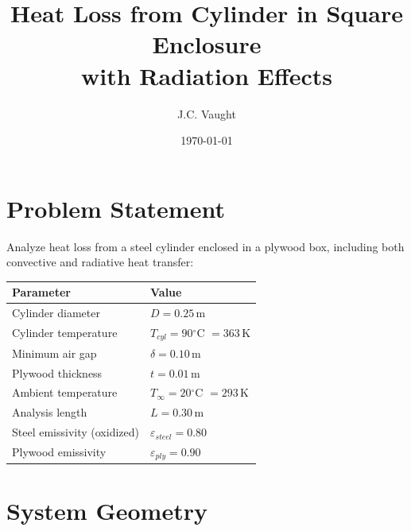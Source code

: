 \documentclass[11pt]{article}
\title{\textbf{Heat Loss from Cylinder in Square Enclosure\\with Radiation Effects}}
\author{J.C. Vaught}
\date{\today}
\newcommand{\degC}{$^\circ$C}
\newcommand{\unit}[1]{\,\mathrm{#1}}
\begin{document}
\maketitle

\section{Problem Statement}

Analyze heat loss from a steel cylinder enclosed in a plywood box, including both convective and radiative heat transfer:

\begin{table}[H]
\centering
\begin{tabular}{ll}
\toprule
\textbf{Parameter} & \textbf{Value} \\
\midrule
Cylinder diameter & $D = 0.25\unit{m}$ \\
Cylinder temperature & $T_{cyl} = 90$\degC{} $= 363\unit{K}$ \\
Minimum air gap & $\delta = 0.10\unit{m}$ \\
Plywood thickness & $t = 0.01\unit{m}$ \\
Ambient temperature & $T_\infty = 20$\degC{} $= 293\unit{K}$ \\
Analysis length & $L = 0.30\unit{m}$ \\
Steel emissivity (oxidized) & $\varepsilon_{steel} = 0.80$ \\
Plywood emissivity & $\varepsilon_{ply} = 0.90$ \\
\bottomrule
\end{tabular}
\end{table}

\section{System Geometry}
\end{document}
